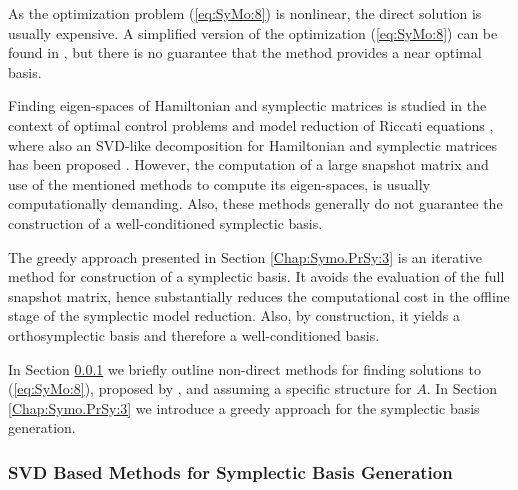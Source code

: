 As the optimization problem (\ref{eq:SyMo:8}) is nonlinear, the direct solution is usually expensive. A simplified version of the optimization (\ref{eq:SyMo:8}) can be found in \cite{Peng:2014di}, but there is no guarantee that the method provides a near optimal basis. 

{\edit Finding eigen-spaces of Hamiltonian and symplectic matrices is studied in the context of optimal control problems \cite{Benner:2000ww,Benner:1997ef,Watkins:2004kz,BunseGerstner:1986dg} and model reduction of Riccati equations \cite{Benner:1997ef}, where also an SVD-like decomposition for Hamiltonian and symplectic matrices has been proposed \cite{Xu:2003kx}. However, the computation of a large snapshot matrix and use of the mentioned methods to compute its eigen-spaces, is usually computationally demanding. Also, these methods generally do not guarantee the construction of a well-conditioned symplectic basis.
	
The greedy approach presented in Section \ref{Chap:Symo.PrSy:3} is an iterative method for construction of a symplectic basis. It avoids the evaluation of the full snapshot matrix, hence substantially reduces the computational cost in the offline stage of the symplectic model reduction. Also, by construction, it yields a orthosymplectic basis and therefore a well-conditioned basis.

In Section \ref{chap:SyMo.PrSy:2} we briefly outline non-direct methods for finding solutions to (\ref{eq:SyMo:8}), proposed by \cite{Peng:2014di}, and assuming a specific structure for $A$. In Section \ref{Chap:Symo.PrSy:3} we introduce a greedy approach for the symplectic basis generation.}

\subsubsection{SVD Based Methods for Symplectic Basis Generation} \label{chap:SyMo.PrSy:2} 


